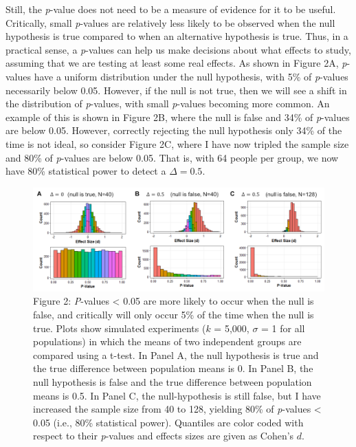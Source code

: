 \documentclass[]{cik}%
\begin{document}
Still, the \emph{p}-value does not need to be a measure of evidence for
it to be useful. Critically, small \emph{p}-values are relatively less
likely to be observed when the null hypothesis is true compared to when
an alternative hypothesis is true. Thus, in a practical sense, a
\emph{p}-values can help us make decisions about what effects to study,
assuming that we are testing at least some real effects. As shown in
Figure 2A, \emph{p}-values have a uniform distribution under the null
hypothesis, with 5\% of \emph{p}-values necessarily below 0.05. However,
if the null is not true, then we will see a shift in the distribution of
\emph{p}-values, with small \emph{p}-values becoming more common. An
example of this is shown in Figure 2B, where the null is false and 34\%
of \emph{p}-values are below 0.05. However, correctly rejecting the null
hypothesis only 34\% of the time is not ideal, so consider Figure 2C,
where I have now tripled the sample size and 80\% of \emph{p}-values are
below 0.05. That is, with 64 people per group, we now have 80\%
statistical power to detect a \(\Delta = 0.5\).

\begin{figure}[H]

{\centering \includegraphics[width=1\linewidth]{figs/fig2} 

}

\caption{Figure 2: \emph{P}-values < 0.05 are more likely to occur when the null is false, and critically will only occur 5\% of the time when the null is true. Plots show simulated experiments ($k$ = 5,000, $\sigma$ = 1 for all populations) in which the means of two independent groups are compared using a t-test. In Panel A, the null hypothesis is true and the true difference between population means is 0. In Panel B, the null hypothesis is false and the true difference between population means is 0.5. In Panel C, the null-hypothesis is still false, but I have increased the sample size from 40 to 128, yielding 80\% of \emph{p}-values < 0.05 (i.e., 80\% statistical power). Quantiles are color coded with respect to their \emph{p}-values and effects sizes are given as Cohen’s $d$.}\label{fig:fig2pdf}
\end{figure}
\end{document}
